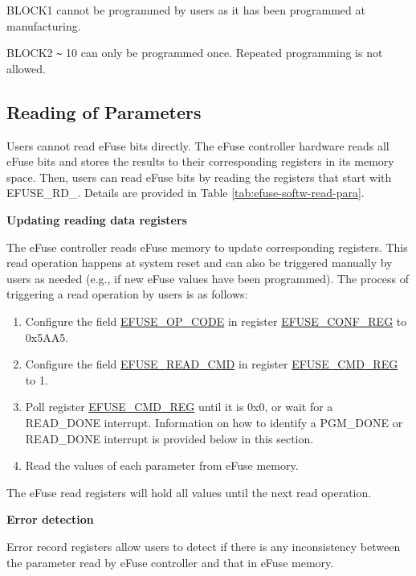 \documentclass[main\_\_EN.tex]{subfiles}
\begin{document}
BLOCK1 cannot be programmed by users as it has been programmed at manufacturing.

BLOCK2 \verb+~+ 10 can only be programmed once. Repeated programming is not allowed.

\subsection{Reading of Parameters}
\label{sec:efuse-software-read-para}

Users cannot read eFuse bits directly. The eFuse controller hardware reads all eFuse bits and stores the results to their corresponding registers in its memory space. Then, users can read eFuse bits by reading the registers that start with EFUSE\_RD\_. Details are provided in Table \ref{tab:efuse-softw-read-para}.



{\bfseries Updating reading data registers}
\label{sec:efuse-update-reg}

The eFuse controller reads eFuse memory to update corresponding registers. This read operation happens at system reset and can also be triggered manually by users as needed (e.g., if new eFuse values have been programmed). The process of triggering a read operation by users is as follows:

\begin{enumerate}
    \item Configure the field \hyperref[fielddesc:EFUSEOPCODE]{EFUSE\_OP\_CODE} in register \hyperref[regdesc:EFUSECONFREG]{EFUSE\_CONF\_REG} to 0x5AA5.
    \item Configure the field \hyperref[fielddesc:EFUSEREADCMD]{EFUSE\_READ\_CMD} in register \hyperref[regdesc:EFUSECMDREG]{EFUSE\_CMD\_REG} to 1.
    \item Poll register \hyperref[regdesc:EFUSECMDREG]{EFUSE\_CMD\_REG} until it is 0x0, or wait for a READ\_DONE interrupt. Information on how to identify a PGM\_DONE or READ\_DONE interrupt is provided below in this section.
    \item Read the values of each parameter from eFuse memory.
\end{enumerate}

The eFuse read registers will hold all values until the next read operation.

{\bfseries Error detection}

Error record registers allow users to detect if there is any inconsistency between the parameter read by eFuse controller and that in eFuse memory.
\end{document}
